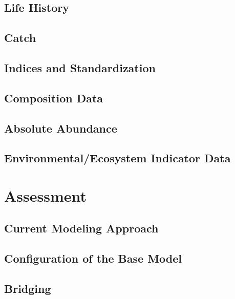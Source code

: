 \documentclass[
]{scrartcl}
\begin{document}
\subsection{Life History}\label{life-history}

\subsection{Catch}\label{catch}

\subsection{Indices and
Standardization}\label{indices-and-standardization}

\subsection{Composition Data}\label{composition-data}

\subsection{Absolute Abundance}\label{absolute-abundance}

\subsection{Environmental/Ecosystem Indicator
Data}\label{environmentalecosystem-indicator-data}

\newpage{}

\section{Assessment}\label{sec-assmt-config}

\subsection{Current Modeling Approach}\label{current-modeling-approach}

\subsection{Configuration of the Base
Model}\label{configuration-of-the-base-model}

\subsection{Bridging}\label{bridging}
\end{document}
